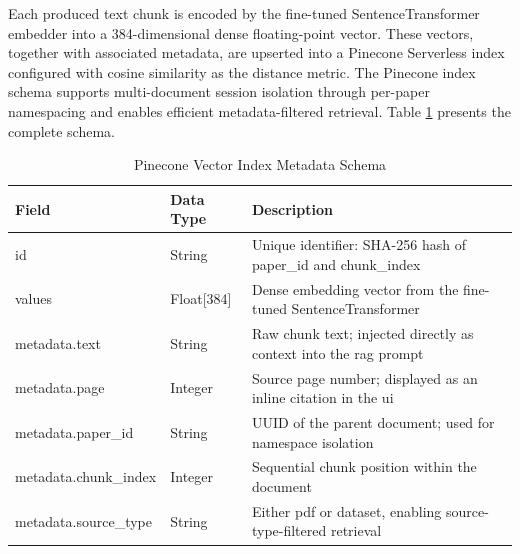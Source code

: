 Each produced text chunk is encoded by the fine-tuned SentenceTransformer embedder into a 384-dimensional dense floating-point vector. These vectors, together with associated metadata, are upserted into a Pinecone Serverless index configured with cosine similarity as the distance metric. The Pinecone index schema supports multi-document session isolation through per-paper namespacing and enables efficient metadata-filtered retrieval. Table \ref{tab:pinecone} presents the complete schema.

\begin{table}[H]

\centering

\caption{Pinecone Vector Index Metadata Schema}

\label{tab:pinecone}

\begin{tabular}{|p{3cm}|p{2.5cm}|p{7cm}|}

\hline

\textbf{Field} & \textbf{Data Type} & \textbf{Description} \\

\hline

id & String & Unique identifier: SHA-256 hash of paper\_id and chunk\_index \\

\hline

values & Float[384] & Dense embedding vector from the fine-tuned SentenceTransformer \\

\hline

metadata.text & String & Raw chunk text; injected directly as context into the \gls{rag} prompt \\

\hline

metadata.page & Integer & Source page number; displayed as an inline citation in the \gls{ui} \\

\hline

metadata.paper\_id & String & UUID of the parent document; used for namespace isolation \\

\hline

metadata.chunk\_index & Integer & Sequential chunk position within the document \\

\hline

metadata.source\_type & String & Either pdf or dataset, enabling source-type-filtered retrieval \\

\hline

\end{tabular}

\end{table}

